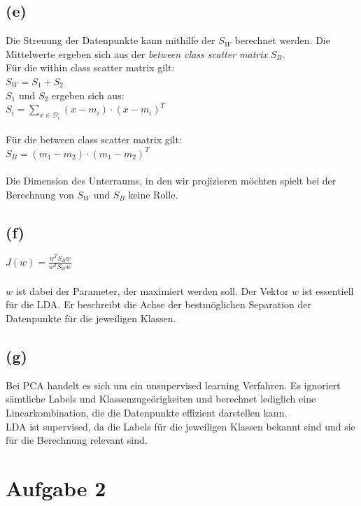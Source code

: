 \documentclass[a4paper]{scrartcl}
\newcounter{punkte}
\begin{document}
\subsection*{(e)}
Die Streuung der Datenpunkte kann mithilfe der  $S_W$ berechnet werden. Die Mittelwerte ergeben sich aus der \textit{between class scatter matrix} $S_B$.\\
Für die within class scatter matrix gilt:\\
$
S_W = S_1 + S_2
$\\
$S_1$ und $S_2$ ergeben sich aus:\\
$
S_i = \sum_{x\in\mathcal{D}_i}(x-m_i)\cdot(x-m_i)^T
$\\
\\
Für die between class scatter matrix gilt:\\
$
S_B = (m_1 - m_2)\cdot(m_1-m_2)^T
$\\
\\
Die Dimension des Unterraums, in den wir projizieren möchten spielt bei der Berechnung von $S_W$ und $S_B$ keine Rolle.



\subsection*{(f)}
$J(w) = \frac{w^T S_B w}{w^T S_W w}$\\
\\
$w$ ist dabei der Parameter, der maximiert werden soll. Der  Vektor $w$ ist essentiell für die LDA. Er beschreibt die Achse der bestmöglichen Separation der Datenpunkte für die jeweiligen Klassen.


\subsection*{(g)}
Bei PCA handelt es sich um ein unsupervised learning Verfahren. Es ignoriert sämtliche Labels und Klassenzugeörigkeiten und berechnet lediglich eine Linearkombination, die die Datenpunkte effizient darstellen kann.\\
LDA ist supervised, da die Labels für die jeweiligen Klassen bekannt sind und sie für die Berechnung relevant sind.


\section*{Aufgabe 2}
\end{document}
